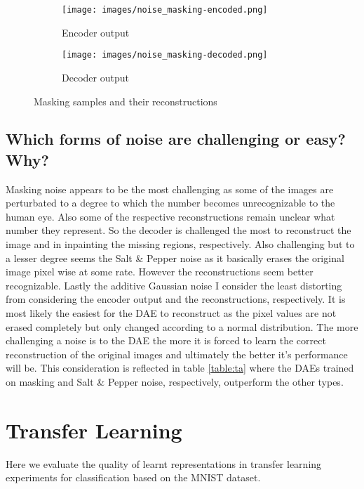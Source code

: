 \documentclass[10pt, a4paper]{article}
\begin{document}
    \begin{figure}[h]
    \begin{subfigure}{0.2\textwidth}
    \texttt{[image: images/noise\_masking-encoded.png]} 
    \caption{Encoder output}
    \label{fig:subim1}
    \end{subfigure}
    \begin{subfigure}{0.2\textwidth}
    \texttt{[image: images/noise\_masking-decoded.png]}
    \caption{Decoder output}
    \label{fig:subim2}
    \end{subfigure}
    \caption{Masking samples and their reconstructions}
    \label{fig:figma}
    \end{figure}    
    
    \subsection{Which forms of noise are challenging or easy? Why?}
    Masking noise appears to be the most challenging as some of the images are perturbated to a degree to which the number becomes unrecognizable to the human eye. Also some of the respective reconstructions remain unclear what number they represent. So the decoder is challenged the most to reconstruct the image and in inpainting the missing regions, respectively.\newline
    Also challenging but to a lesser degree seems the Salt \& Pepper noise as it basically erases the original image pixel wise at some rate. However the reconstructions seem better recognizable. Lastly the additive Gaussian noise I consider the least distorting from considering the encoder output and the reconstructions, respectively. It is most likely the easiest for the DAE to reconstruct as the pixel values are not erased completely but only changed according to a normal distribution.\newline
    The more challenging a noise is to the DAE the more it is forced to learn the correct reconstruction of the original images and ultimately the better it's performance will be. This consideration is reflected in table \ref{table:ta} where the DAEs trained on masking and Salt \& Pepper noise, respectively, outperform the other types.
    
	
	\section{Transfer Learning}
	Here we evaluate the quality of learnt representations in transfer learning experiments for classification based on the MNIST dataset.
	
\end{document}
